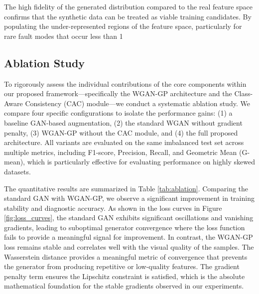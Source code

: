 The high fidelity of the generated distribution compared to the real feature space confirms that the synthetic data can be treated as viable training candidates. By populating the under-represented regions of the feature space, particularly for rare fault modes that occur less than 1%

\subsection{Ablation Study}
\label{subsec:ablation}

To rigorously assess the individual contributions of the core components within our proposed framework—specifically the WGAN-GP architecture and the Class-Aware Consistency (CAC) module—we conduct a systematic ablation study. We compare four specific configurations to isolate the performance gains: (1) a baseline GAN-based augmentation, (2) the standard WGAN without gradient penalty, (3) WGAN-GP without the CAC module, and (4) the full proposed architecture. All variants are evaluated on the same imbalanced test set across multiple metrics, including F1-score, Precision, Recall, and Geometric Mean (G-mean), which is particularly effective for evaluating performance on highly skewed datasets.

The quantitative results are summarized in Table \ref{tab:ablation}. Comparing the standard GAN with WGAN-GP, we observe a significant improvement in training stability and diagnostic accuracy. As shown in the loss curves in Figure \ref{fig:loss_curves}, the standard GAN exhibits significant oscillations and vanishing gradients, leading to suboptimal generator convergence where the loss function fails to provide a meaningful signal for improvement. In contrast, the WGAN-GP loss remains stable and correlates well with the visual quality of the samples. The Wasserstein distance provides a meaningful metric of convergence that prevents the generator from producing repetitive or low-quality features. The gradient penalty term ensures the Lipschitz constraint is satisfied, which is the absolute mathematical foundation for the stable gradients observed in our experiments.

